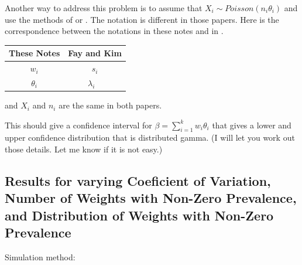 \documentclass{article}
\begin{document}
Another way to address this problem is to assume that $X_i \sim Poisson( n_i \theta_i)$ and use the methods
of \citet{FayF:1997} or \citet{FayK:2017}.
The notation is different in those papers. Here is the correspondence between the notations in these notes and in \citet{FayK:2017}.

\begin{tabular}{cc}
These Notes & Fay and Kim  \\ \hline
$w_i$     & $s_i$ \\
$\theta_i$ & $\lambda_i$ \
\end{tabular}

and $X_i$ and $n_i$ are the same in both papers. 


This should give a confidence interval for $\beta=\sum_{i=1}^{k} w_i \theta_i$
that gives a lower and upper confidence distribution that is distributed gamma. (I will let you work out those details. Let me know if it is not easy.)

\subsection{Results for varying Coeficient of Variation, Number of Weights with Non-Zero Prevalence, and Distribution of Weights with Non-Zero Prevalence}

Simulation method:
\end{document}
